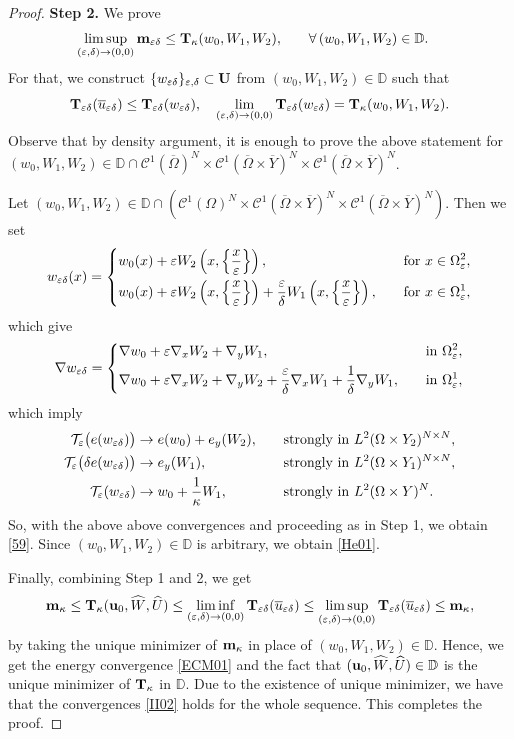 \documentclass[11pt,a4paper]{article}
\numberwithin{equation}{section}
\def\wo{\overline}
\def\O{\Omega}
\def\d{\delta}
\def\e{\varepsilon}
\def\C{\mathcal{C}}
\def\Te{{\cal T}_\varepsilon}
\def\D{{\mathbb{D}}}
\def\ed{{\varepsilon\delta}}
\def\wh{\widehat }
\def\X{\times }
\def\Gm{{\bf m}}
\def\Gu{{\bf u}}
\def\GT{{\bf T}}
\def\GU{{\bf U}}
\begin{document}
\begin{proof}
	{\bf Step 2.} 	We prove
	\begin{equation}\label{He01}
		\begin{aligned}
			\limsup_{(\e,\d)\to(0,0)}\Gm_\ed\leq \GT_\kappa(w_0,W_1,W_2),\quad&&&\forall\, (w_0,W_1,W_2)\in\D.
		\end{aligned}	
	\end{equation}
	For that, we construct $\{w_\ed\}_{\e,\d}\subset \GU$ from $(w_0,W_1,W_2)\in\D$ such that
	\begin{equation}\label{59}
		\GT_\ed(\wo u_\ed)\leq \GT_\ed(w_\ed),\quad \lim_{(\e,\d)\to(0,0)}\GT_\ed(w_\ed)=\GT_\kappa(w_0,W_1,W_2).
	\end{equation}
	Observe that by density argument, it is enough to prove the above statement for $(w_0,W_1,W_2)\in\D\cap \C^1(\wo\O)^N\X \C^1(\wo{\O}\X \wo{Y})^N\X\C^1(\wo{\O}\X \wo{Y})^N$. 
	
	Let $(w_0,W_1,W_2)\in \D \cap \left(\C^1(\O)^N\X \C^1(\wo{\O}\X \wo{Y})^N\X\C^1(\wo{\O}\X \wo{Y})^N\right)$.  Then we set
	\begin{equation}\label{Test01}
		w_\ed(x)=\left\{\begin{aligned}
			&w_0(x)+\e W_2\left(x,\left\{{x\over \e}\right\}\right),\quad&&\text{for $x\in \O^2_\e$},\\
			&w_0(x)+\e W_2\left(x,\left\{{x\over \e}\right\}\right)+{\e\over \d}W_1\left(x,\left\{{x\over \e}\right\}\right),\quad&&\text{for $x\in\O^1_\e$},
		\end{aligned}\right.
	\end{equation} 
	which give
	$$\nabla w_\ed=\left\{\begin{aligned}
		&\nabla w_0+\e \nabla_x W_2+\nabla_y W_1,\quad&&\text{in $\O^2_\e$},\\
		&\nabla w_0+\e \nabla_x W_2+\nabla_y W_2+{\e\over \d}\nabla_x W_1+{1\over \d}\nabla_y W_1,\quad&&\text{in $\O^1_\e$},
	\end{aligned}\right.$$ 
	which imply
	$$\begin{aligned}
		\Te\big(e(w_\ed)\big)&\to e(w_0)+e_y(W_2),\quad &&\text{strongly in $L^2(\O\X Y_2)^{N\X N}$},\\
		\Te\big(\d e(w_\ed)\big) &\to e_y(W_1),\quad&&\text{strongly in $L^2(\O\X Y_1)^{N\X N}$},\\
		\Te(w_\ed) &\to w_0+{1\over \kappa}W_1,\quad &&\text{strongly in $L^2(\O\X Y)^N$}.
	\end{aligned}$$
	So, with the above above convergences and proceeding as in Step 1, we obtain \eqref{59}. Since $(w_0,W_1,W_2)\in\D$ is arbitrary, we obtain \eqref{He01}.

Finally, combining Step 1 and 2, we get
$$\Gm_\kappa\leq  \GT_\kappa(\Gu_0,\wh W,\wh U)\leq \liminf_{(\e,\d)\to(0,0)}\GT_\ed(\wo u_\ed)\leq \limsup_{(\e,\d)\to(0,0)}\GT_\ed(\wo u_\ed)\leq \Gm_\kappa,$$
by taking the unique minimizer of $\Gm_\kappa$ in place of $(w_0,W_1,W_2)\in\D$. Hence, we get the energy convergence \eqref{ECM01} and the fact that $(\Gu_0,\wh W,\wh U)\in\D$ is the unique minimizer of $\GT_\kappa$ in $\D$. Due to the existence of unique minimizer, we have that the convergences \eqref{II02} holds for the whole sequence.
This completes the proof.
\end{proof}
\end{document}
